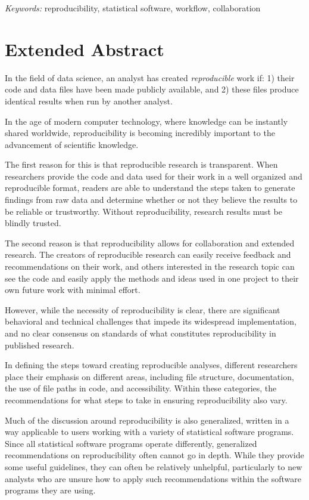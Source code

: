 \documentclass[12pt]{article}
\begin{document}
\noindent%
{\it Keywords:} reproducibility, statistical software, workflow, collaboration
\vfill

\newpage
{} %

\section{Extended Abstract}\label{extended-abstract}

In the field of data science, an analyst has created \emph{reproducible}
work if: 1) their code and data files have been made publicly available,
and 2) these files produce identical results when run by another
analyst.

In the age of modern computer technology, where knowledge can be
instantly shared worldwide, reproducibility is becoming incredibly
important to the advancement of scientific knowledge.

The first reason for this is that reproducible research is transparent.
When researchers provide the code and data used for their work in a well
organized and reproducible format, readers are able to understand the
steps taken to generate findings from raw data and determine whether or
not they believe the results to be reliable or trustworthy. Without
reproducibility, research results must be blindly trusted.

The second reason is that reproducibility allows for collaboration and
extended research. The creators of reproducible research can easily
receive feedback and recommendations on their work, and others
interested in the research topic can see the code and easily apply the
methods and ideas used in one project to their own future work with
minimal effort.

However, while the necessity of reproducibility is clear, there are
significant behavioral and technical challenges that impede its
widespread implementation, and no clear consensus on standards of what
constitutes reproducibility in published research.

In defining the steps toward creating reproducible analyses, different
researchers place their emphasis on different areas, including file
structure, documentation, the use of file paths in code, and
accessibility. Within these categories, the recommendations for what
steps to take in ensuring reproducibility also vary.

Much of the discussion around reproducibility is also generalized,
written in a way applicable to users working with a variety of
statistical software programs. Since all statistical software programs
operate differently, generalized recommendations on reproducibility
often cannot go in depth. While they provide some useful guidelines,
they can often be relatively unhelpful, particularly to new analysts who
are unsure how to apply such recommendations within the software
programs they are using.
\end{document}
